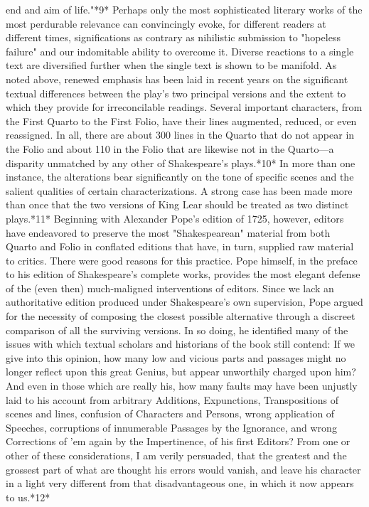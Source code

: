 end and aim of life."*9* Perhaps only the most sophisticated literary works of the most perdurable relevance can convincingly evoke, for different readers at different times, significations as contrary as nihilistic submission to "hopeless failure" and our indomitable ability to overcome it.
	Diverse reactions to a single text are diversified further when the single text is shown to be manifold. As noted above, renewed emphasis has been laid in recent years on the significant textual differences between the play's two principal versions and the extent to which they provide for irreconcilable readings. Several important characters, from the First Quarto to the First Folio, have their lines augmented, reduced, or even reassigned. In all, there are about 300 lines in  the Quarto that do not appear in the Folio and about 110 in the Folio that are likewise not in the Quarto—a disparity unmatched by any other of Shakespeare's plays.*10* In more than one instance, the alterations bear significantly on the tone of specific scenes and the salient qualities of certain characterizations. A strong case has been made more than once that the two versions of King Lear should be treated as two distinct plays.*11* Beginning with Alexander Pope's edition of 1725, however, editors have endeavored to preserve the most "Shakespearean" material from both Quarto and Folio in conflated editions that have, in turn, supplied raw material to critics. There were good reasons for this practice. Pope himself, in the preface to his edition of Shakespeare's complete works, provides the most elegant defense of the (even then) much-maligned interventions of editors. Since we lack an authoritative edition produced under Shakespeare's own supervision, Pope argued for the necessity of composing the closest possible alternative through a discreet comparison of all the surviving versions. In so doing, he identified many of the issues with which textual scholars and historians of the book still contend:
If we give into this opinion, how many low and vicious parts and passages might no longer reflect upon this great Genius, but appear unworthily charged upon him? And even in those which are really his, how many faults may have been unjustly laid to his account from arbitrary Additions, Expunctions, Transpositions of scenes and lines, confusion of Characters and Persons, wrong application of Speeches, corruptions of innumerable Passages by the Ignorance, and wrong Corrections of 'em again by the Impertinence, of his first Editors? From one or other of these considerations, I am verily persuaded, that the greatest and the grossest part of what are thought his errors would vanish, and leave his character in a light very different from that disadvantageous one, in which it now appears to us.*12*
